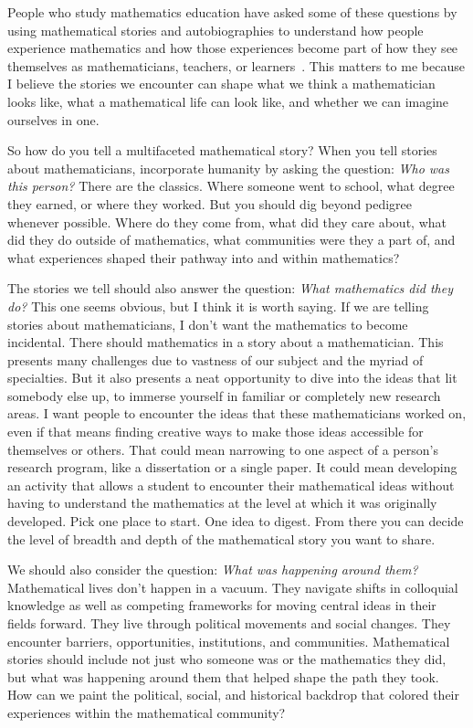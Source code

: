 \documentclass[pdflatex,sn-mathphys-num]{sn-jnl}%
\begin{document}
People who study mathematics education have asked some of these questions by using mathematical stories and autobiographies to understand how people experience mathematics and how those experiences become part of how they see themselves as mathematicians, teachers, or learners~\cite{drake2006turning,mcculloch2013math}. This matters to me because I believe the stories we encounter can shape what we think a mathematician looks like, what a mathematical life can look like, and whether we can imagine ourselves in one.

So how do you tell a multifaceted mathematical story? When you tell stories about mathematicians, incorporate humanity by asking the question: \emph{Who was this person?} There are the classics. Where someone went to school, what degree they earned, or where they worked. But you should dig beyond pedigree whenever possible.  Where do they come from, what did they care about, what did they do outside of mathematics, what communities were they a part of, and what experiences shaped their pathway into and within mathematics? 

The stories we tell should also answer the question: \emph{What mathematics did they do?} This one seems obvious, but I think it is worth saying. If we are telling stories about mathematicians, I don't want the mathematics to become incidental. There should mathematics in a story about a mathematician. This presents many challenges due to vastness of our subject and the myriad of specialties. But it also presents a neat opportunity to dive into the ideas that lit somebody else up, to immerse yourself in familiar or completely new research areas. I want people to encounter the ideas that these mathematicians worked on, even if that means finding creative ways to make those ideas accessible for themselves or others. That could mean narrowing to one aspect of a person's research program, like a dissertation or a single paper. It could mean developing an activity that allows a student to encounter their mathematical ideas without having to understand the mathematics at the level at which it was originally developed. Pick one place to start. One idea to digest. From there you can decide the level of breadth and depth of the mathematical story you want to share.  

We should also consider the question: \emph{What was happening around them?} Mathematical lives don't happen in a vacuum. They navigate shifts in colloquial knowledge as well as competing frameworks for moving central ideas in their fields forward. They live through political movements and social changes. They encounter barriers, opportunities, institutions, and communities. Mathematical stories should include not just who someone was or the mathematics they did, but what was happening around them that helped shape the path they took. How can we paint the political, social, and historical backdrop that colored their experiences within the mathematical community? 
\end{document}
